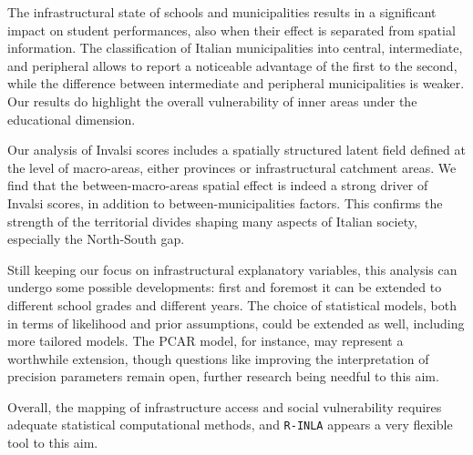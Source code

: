 \documentclass[openany]{book}
\begin{document}
The infrastructural state of schools and municipalities results in a significant impact on student performances, also when their effect is separated from spatial information. The classification of Italian municipalities into central, intermediate, and peripheral allows to report a noticeable advantage of the first to the second, while the difference between intermediate and peripheral municipalities is weaker. Our results do highlight the overall vulnerability of inner areas under the educational dimension.

Our analysis of Invalsi scores includes a spatially structured latent field defined at the level of macro-areas, either provinces or infrastructural catchment areas. We find that the between-macro-areas spatial effect is indeed a strong driver of Invalsi scores, in addition to between-municipalities factors. This confirms the strength of the territorial divides shaping many aspects of Italian society, especially the North-South gap.

Still keeping our focus on infrastructural explanatory variables, this analysis can undergo some possible developments: first and foremost it can be extended to different school grades and different years. The choice of statistical models, both in terms of likelihood and prior assumptions, could be extended as well, including more tailored models. The PCAR model, for instance, may represent a worthwhile extension, though questions like improving the interpretation of precision parameters remain open, further research being needful to this aim.

Overall, the mapping of infrastructure access and social vulnerability requires adequate statistical computational methods, and \texttt{R-INLA} appears a very flexible tool to this aim.
\end{document}
